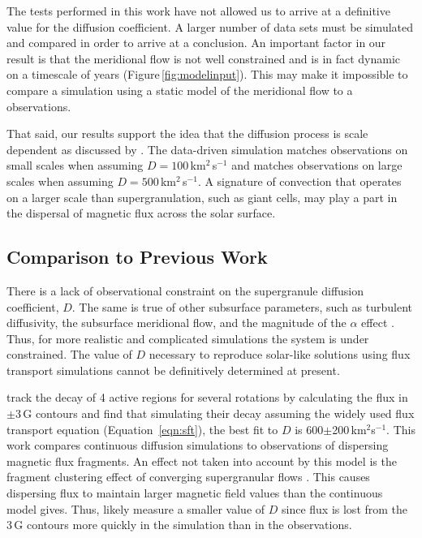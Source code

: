 The tests performed in this work have not allowed us to arrive at a definitive value for the diffusion coefficient. A larger number of data sets must be simulated and compared in order to arrive at a conclusion. An important factor in our result is that the meridional flow is not well constrained and is in fact dynamic on a timescale of years (Figure\,\ref{fig:modelinput}). This may make it impossible to compare a simulation using a static model of the meridional flow to a observations.

That said, our results support the idea that the diffusion process is scale dependent as discussed by \cite{Hagenaar:1999}. The data-driven simulation matches observations on small scales when assuming $D=100$\,km$^2$\,s$^{-1}$ and matches observations on large scales when assuming $D=500$\,km$^2$\,s$^{-1}$. A signature of convection that operates on a larger scale than supergranulation, such as giant cells, may play a part in the dispersal of magnetic flux across the solar surface.



\subsection{Comparison to Previous Work}

There is a lack of observational constraint on the supergranule diffusion coefficient, $D$. The same is true of other subsurface parameters, such as turbulent diffusivity, the subsurface meridional flow, and the magnitude of the $\alpha$ effect \cite{Dikpati:2002,Dikpati:2004}. Thus, for more realistic and complicated simulations the system is under constrained. The value of $D$ necessary to reproduce solar-like solutions using flux transport simulations cannot be definitively determined at present.

\cite{Wang:1989} track the decay of 4 active regions for several rotations by calculating the flux in $\pm$3\,G contours and find that simulating their decay assuming the widely used flux transport equation (Equation~\ref{eqn:sft}), the best fit to $D$ is 600$\pm$200\,km$^2$s$^{-1}$. This work compares continuous diffusion simulations to observations of dispersing magnetic flux fragments. An effect not taken into account by this model is the fragment clustering effect of converging supergranular flows \citep{Schrijver:1992}. This causes dispersing flux to maintain larger magnetic field values than the continuous model gives. Thus, \cite{Wang:1989} likely measure a smaller value of $D$ since flux is lost from the 3\,G contours more quickly in the simulation than in the observations.

